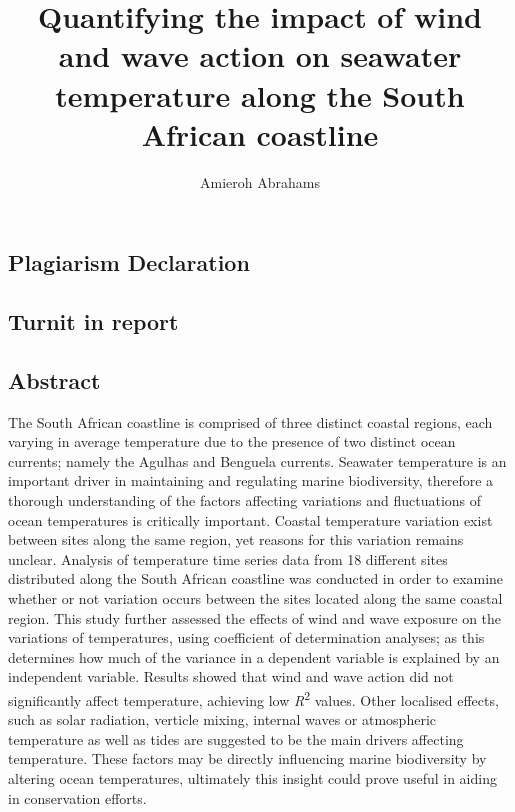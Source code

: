 \documentclass[10pt,a4paper,]{article}
\title{Quantifying the impact of wind and wave action on seawater temperature
along the South African coastline}
\author{Amieroh Abrahams}
\date{}
\begin{document}
\maketitle

{
\setcounter{tocdepth}{4}
\tableofcontents
}
\newpage

\hypertarget{plagiarism-declaration}{%
\subsection{Plagiarism Declaration}\label{plagiarism-declaration}}

\newpage

\hypertarget{turnit-in-report}{%
\subsection{Turnit in report}\label{turnit-in-report}}

\newpage

\hypertarget{abstract}{%
\subsection{Abstract}\label{abstract}}

The South African coastline is comprised of three distinct coastal
regions, each varying in average temperature due to the presence of two
distinct ocean currents; namely the Agulhas and Benguela currents.
Seawater temperature is an important driver in maintaining and
regulating marine biodiversity, therefore a thorough understanding of
the factors affecting variations and fluctuations of ocean temperatures
is critically important. Coastal temperature variation exist between
sites along the same region, yet reasons for this variation remains
unclear. Analysis of temperature time series data from 18 different
sites distributed along the South African coastline was conducted in
order to examine whether or not variation occurs between the sites
located along the same coastal region. This study further assessed the
effects of wind and wave exposure on the variations of temperatures,
using coefficient of determination analyses; as this determines how much
of the variance in a dependent variable is explained by an independent
variable. Results showed that wind and wave action did not significantly
affect temperature, achieving low \emph{R}\textsuperscript{2} values.
Other localised effects, such as solar radiation, verticle mixing,
internal waves or atmospheric temperature as well as tides are suggested
to be the main drivers affecting temperature. These factors may be
directly influencing marine biodiversity by altering ocean temperatures,
ultimately this insight could prove useful in aiding in conservation
efforts.
\end{document}
